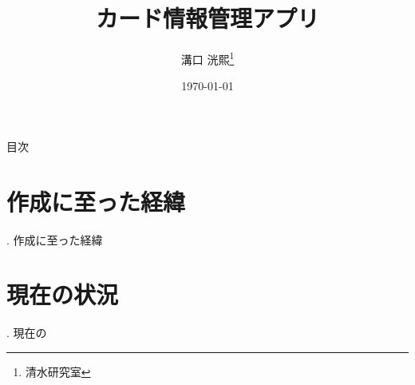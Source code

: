 \documentclass{beamer}
\title{カード情報管理アプリ}
\author[K.MIZOGUCHI]{溝口 洸熙\thanks{清水研究室}}
\date{\today}
\institute[KUT]{高知工科大学 情報学群}
\begin{document}
\begin{frame}
    \titlepage
\end{frame}
\begin{frame}{目次}
    \tableofcontents
\end{frame}
\section{作成に至った経緯}
\begin{frame}{\thesection. 作成に至った経緯}

\end{frame}
\section{現在の状況}
\begin{frame}{\thesection. 現在の}

\end{frame}
\end{document}
